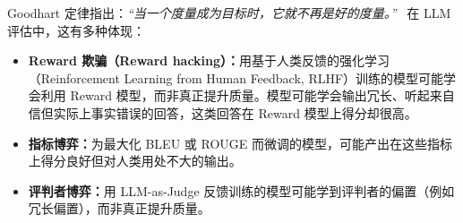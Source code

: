 Goodhart 定律指出：\emph{“当一个度量成为目标时，它就不再是好的度量。”}~\cite{goodhart1984problems} 在 LLM 评估中，这有多种体现：

\begin{itemize}
  \item \textbf{Reward 欺骗（Reward hacking）：}用基于人类反馈的强化学习（Reinforcement Learning from Human Feedback, RLHF）训练的模型可能学会利用 Reward 模型，而非真正提升质量。模型可能学会输出冗长、听起来自信但实际上事实错误的回答，这类回答在 Reward 模型上得分却很高。
  \item \textbf{指标博弈：}为最大化 BLEU 或 ROUGE 而微调的模型，可能产出在这些指标上得分良好但对人类用处不大的输出。
  \item \textbf{评判者博弈：}用 LLM-as-Judge 反馈训练的模型可能学到评判者的偏置（例如冗长偏置），而非真正提升质量。
\end{itemize}

